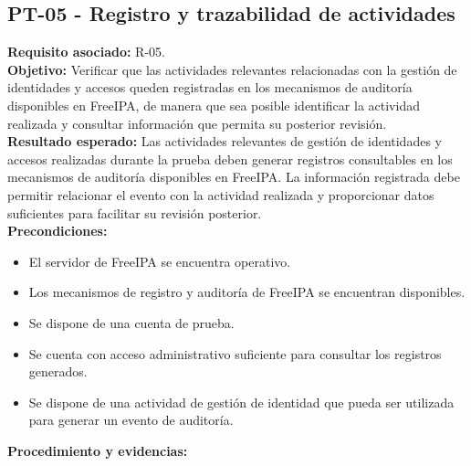 \subsection{PT-05 - Registro y trazabilidad de actividades}\label{subsec:pt05}
\textbf{Requisito asociado:} R-05.\\
\textbf{Objetivo:} Verificar que las actividades relevantes relacionadas con la gestión de identidades y accesos queden registradas en los mecanismos de auditoría disponibles en FreeIPA, de manera que sea posible identificar la actividad realizada y consultar información que permita su posterior revisión.\\
\textbf{Resultado esperado:} Las actividades relevantes de gestión de identidades y accesos realizadas durante la prueba deben generar registros consultables en los mecanismos de auditoría disponibles en FreeIPA.
La información registrada debe permitir relacionar el evento con la actividad realizada y proporcionar datos suficientes para facilitar su revisión posterior.\\
\textbf{Precondiciones:}
\begin{itemize}
	\item El servidor de FreeIPA se encuentra operativo.
	\item Los mecanismos de registro y auditoría de FreeIPA se encuentran disponibles.
	\item Se dispone de una cuenta de prueba.
	\item Se cuenta con acceso administrativo suficiente para consultar los registros generados.
	\item Se dispone de una actividad de gestión de identidad que pueda ser utilizada para generar un evento de auditoría.
\end{itemize}
\textbf{Procedimiento y evidencias:}
